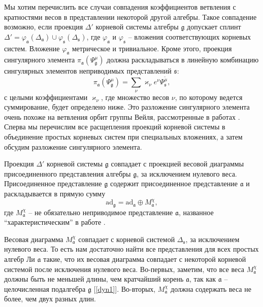 \documentclass[12pt]{article}
\newcommand{\pia}{\pi_{\mathfrak{a}}}
\newcommand{\gf}{\mathfrak{g}}
\newcommand{\af}{\mathfrak{a}}
\newcommand{\sfr}{\mathfrak{s}}
\begin{document}
Мы хотим перечислить все случаи совпадения коэффициентов ветвления с кратностями весов в
представлении некоторой другой алгебры. Такое совпадение возможно, если проекция $\Delta'$ корневой
системы алгебры $\gf$ допускает сплинт $\Delta'=\varphi_{\af}(\Delta_{\af})\cup
\varphi_{\sfr}(\Delta_{\sfr})$, где  $\varphi_{\af}$ и $\varphi_{\sfr}$ -- вложения соответствующих
корневых систем. Вложение  $\varphi_{\af}$ метрическое и тривиальное. Кроме этого, проекция
сингулярного элемента  $\pia\left(\Psi^{\mu}_{\gf}\right)$ должна раскладываться в линейную
комбинацию сингулярных элементов неприводимых представлений $\sfr$:
\begin{equation}
  \label{eq:4}
  \pia\left(\Psi^{\mu}_{\gf}\right)=\sum_{\nu} \varkappa_{\nu}e^{\nu}\Psi^{\tilde\mu}_{\sfr},
\end{equation}
с целыми коэффициентами  $\varkappa_{\nu}$, где  множество весов  $\nu$, по которому ведется
суммирование, будет определено ниже. Это разложение сингулярного элемента очень похоже на ветвления
орбит группы Вейля, рассмотренные в работах  \cite{larouche2011branching,larouche2009branching}.
Сперва мы перечислим все расщепления проекций корневой системы в объединение простых корневых систем
при специальных вложениях, а затем обсудим разложение сингулярного элемента. 

Проекция  $\Delta'$ корневой системы  $\gf$ совпадает с проекцией весовой диаграммы присоединенного
представления алгебры  $\gf$, за исключением нулевого веса. Присоединенное представление  $\gf$
содержит присоединенное представление  $\af$ и раскладывается в прямую сумму
\begin{equation}
  \label{eq:3}
  \mathrm{ad}_{\gf}=\mathrm{ad}_{\af}\oplus M_{\af}^{\chi},
\end{equation}
где  $M^{\chi}_{\af}$ -- не обязательно неприводимое представление $\af$, названное 
``характеристическим'' в работе \cite{dynkin1952semisimpleru}. 


Весовая диаграмма $M^{\chi}_{\af}$ совпадает с корневой системой  $\Delta_{\sfr}$, за исключением
нулевого веса. То есть нам достаточно найти все представления для всех простых алгебр Ли $\af$
такие, что их весовая диаграмма совпадает с некоторой корневой системой после исключения нулевого
веса. Во-первых, заметим, что все веса  $M^{\chi}_{\af}$ должны быть  не меньшей длины, чем
кратчайший корень $\af$, так как $\af$ -- целочисленная подалгебра $\gf$ [\ref{dyn1}]. Во-вторых,
$M^{\chi}_{\af}$ должна содержать веса не более, чем двух разных длин. 
\end{document}
